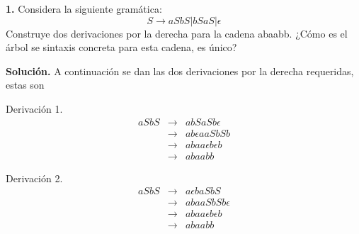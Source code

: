 \textbf{1.} Considera la siguiente gramática:
\[S \rightarrow aSbS | bSaS | \epsilon\]
Construye dos derivaciones por la derecha para la cadena abaabb.\newline
¿Cómo es el árbol se sintaxis concreta para esta cadena, es único?
\newline

\textbf{Solución.} A continuación se dan las dos derivaciones por la derecha requeridas, estas son
\begin{multicols}{2}
        Derivación 1.
        \begin{eqnarray*}
                aSbS &\rightarrow& abSaSb\epsilon\\
                &\rightarrow& ab\epsilon aaSbSb\\
                &\rightarrow& abaa\epsilon b\epsilon b\\
                &\rightarrow& abaabb
        \end{eqnarray*}

        Derivación 2.
        \begin{eqnarray*}
                aSbS &\rightarrow& a\epsilon baSbS\\
                &\rightarrow& abaaSbSb\epsilon\\
                &\rightarrow& abaa\epsilon b\epsilon b\\
                &\rightarrow& abaabb
        \end{eqnarray*}
\end{multicols}
